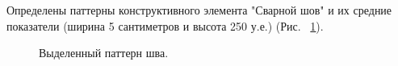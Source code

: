 \documentclass[a4paper,article,14pt]{extarticle}
\begin{document}
Определены паттерны конструктивного элемента "Сварной шов" и их средние показатели 
(ширина 5 сантиметров и высота 250 у.е.) (Рис. ~\ref{image4}).
\pagebreak

\begin{figure}[ht]
    \begin{center}
    
    \caption{
    \label{image4}
    Выделенный паттерн шва.}
    \end {center}
\end {figure}

\pagebreak
\end{document}
